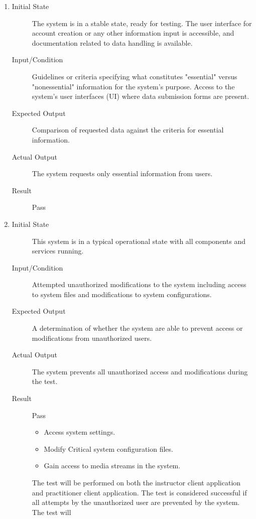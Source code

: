 \documentclass[12pt, titlepage]{article}
\begin{document}
\begin{enumerate}[NFR-T1]
  \addtocounter{enumi}{2}
  \item \label{NFRT22}
    \begin{description}
    \item[Initial State] The system is in a stable state, ready for testing. The
      user interface for account creation or any other information input is
      accessible, and documentation related to data handling is available.
    \item[Input/Condition] Guidelines or criteria specifying what constitutes
      "essential" versus "nonessential" information for the system’s purpose.
      Access to the system's user interfaces (UI) where data submission forms are
      present.
    \item[Expected Output] Comparison of requested data against the criteria for
      essential information.
    \item[Actual Output] The system requests only essential information from users.
    \item[Result] Pass 
    \end{description}
  \item \label{NFRT23}
    \begin{description}
    \item[Initial State] This system is in a typical operational state with all
      components and services running.
    \item[Input/Condition] Attempted unauthorized modifications to the system
      including access to system files and modifications to system configurations.
    \item[Expected Output] A determination of whether the system are able to prevent
      access or modifications from unauthorized users.
    \item[Actual Output] The system prevents all unauthorized access and modifications 
    during the test.
    \item[Result] Pass 
      \begin{itemize}
      \item Access system settings.
      \item Modify Critical system configuration files.
      \item Gain access to media streams in the system.
      \end{itemize}
      The test will be performed on both the instructor client application and
      practitioner client application. The test is considered successful if all
      attempts by the unauthorized user are prevented by the system. The test will

\end{description}
\end{enumerate}
\end{document}
